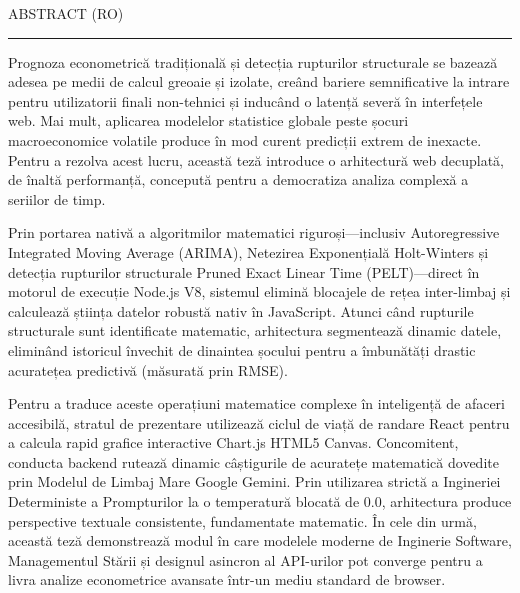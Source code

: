 \documentclass[11pt]{report}
\begin{document}
\newpage
ABSTRACT (RO)
\vspace{0.5cm}	
\hrule
\vspace{0.5cm}	

Prognoza econometrică tradițională și detecția rupturilor structurale se bazează adesea pe medii de calcul greoaie și izolate, creând bariere semnificative la intrare pentru utilizatorii finali non-tehnici și inducând o latență severă în interfețele web. Mai mult, aplicarea modelelor statistice globale peste șocuri macroeconomice volatile produce în mod curent predicții extrem de inexacte. Pentru a rezolva acest lucru, această teză introduce o arhitectură web decuplată, de înaltă performanță, concepută pentru a democratiza analiza complexă a seriilor de timp.

Prin portarea nativă a algoritmilor matematici riguroși—inclusiv Autoregressive Integrated Moving Average (ARIMA), Netezirea Exponențială Holt-Winters și detecția rupturilor structurale Pruned Exact Linear Time (PELT)—direct în motorul de execuție Node.js V8, sistemul elimină blocajele de rețea inter-limbaj și calculează știința datelor robustă nativ în JavaScript. Atunci când rupturile structurale sunt identificate matematic, arhitectura segmentează dinamic datele, eliminând istoricul învechit de dinaintea șocului pentru a îmbunătăți drastic acuratețea predictivă (măsurată prin RMSE).

Pentru a traduce aceste operațiuni matematice complexe în inteligență de afaceri accesibilă, stratul de prezentare utilizează ciclul de viață de randare React pentru a calcula rapid grafice interactive Chart.js HTML5 Canvas. Concomitent, conducta backend rutează dinamic câștigurile de acuratețe matematică dovedite prin Modelul de Limbaj Mare Google Gemini. Prin utilizarea strictă a Ingineriei Deterministe a Prompturilor la o temperatură blocată de $0.0$, arhitectura produce perspective textuale consistente, fundamentate matematic. În cele din urmă, această teză demonstrează modul în care modelele moderne de Inginerie Software, Managementul Stării și designul asincron al API-urilor pot converge pentru a livra analize econometrice avansate într-un mediu standard de browser.

\tableofcontents

\newpage
{}






\end{document}
